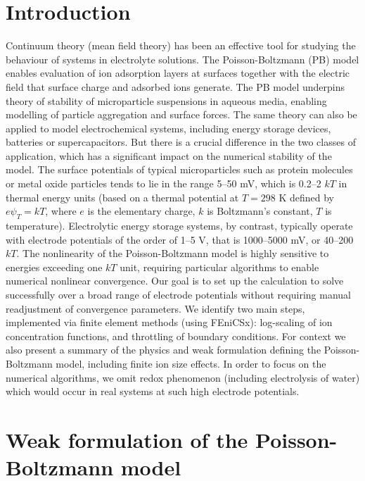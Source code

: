 \section*{Introduction}

Continuum theory (mean field theory) has been an effective tool for
studying the behaviour of systems in electrolyte solutions. The
Poisson-Boltzmann (PB) model \cite{Wu2022} enables evaluation of ion
adsorption layers at surfaces together with the electric field that
surface charge and adsorbed ions generate. The PB model underpins
theory of stability of microparticle suspensions in aqueous media,
enabling modelling of particle aggregation and surface forces. The
same theory can also be applied to model electrochemical
systems, including energy storage devices, batteries or
supercapacitors. But there is a crucial difference in the two classes
of application, which has a significant impact on the numerical
stability of the model.  The surface potentials
of typical microparticles such as protein molecules or metal oxide
particles tends to lie in the range 5--50 mV, which is 0.2--2
$kT$ in thermal energy units (based on a thermal potential at $T=298$
K defined by $e\psi_{T} = kT$, where $e$ is the elementary charge, $k$
is Boltzmann's constant, $T$ is temperature). Electrolytic energy
storage systems, by contrast, typically operate with electrode
potentials of the order of 1--5 V, that is 1000--5000 mV, or 40--200
$kT$.  The nonlinearity of the Poisson-Boltzmann model is highly
sensitive to energies exceeding one $kT$ unit, requiring particular
algorithms to enable numerical nonlinear convergence.  Our goal is to
set up the calculation to solve successfully over a broad range of
electrode potentials without requiring manual readjustment of
convergence parameters.  We identify two main steps, implemented via
finite element methods (using FEniCSx\cite{baratta2023dolfinx}): log-scaling of
ion concentration functions, and throttling of boundary
conditions. For context we also present a summary of the physics and
weak formulation defining the Poisson-Boltzmann model, including
finite ion size effects.
In order to focus on the numerical algorithms, we omit redox
phenomenon (including electrolysis of water) which would occur in real
systems at such high electrode potentials.

\section{Weak formulation of the Poisson-Boltzmann model}

